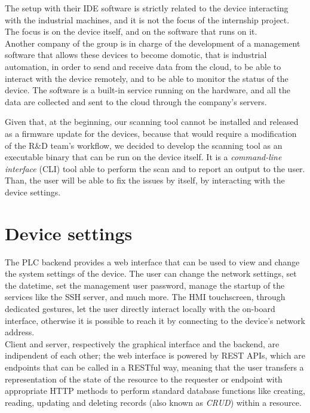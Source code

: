 The setup with their IDE software is strictly related to the device interacting with the industrial machines, and it is not the focus of the internship project. The focus is on the device itself, and on the software that runs on it. \\
Another company of the group is in charge of the development of a management software that allows these devices to become domotic, that is industrial automation, in order to send and receive data from the cloud, to be able to interact with the device remotely, and to be able to monitor the status of the device. The software is a built-in service running on the hardware, and all the data are collected and sent to the cloud through the company's servers.

Given that, at the beginning, our scanning tool cannot be installed and released as a firmware update for the devices, because that would require a modification of the R\&D team's workflow, we decided to develop the scanning tool as an executable binary that can be run on the device itself. It is a \textit{command-line interface} (CLI) tool able to perform the scan and to report an output to the user. Than, the user will be able to fix the issues by itself, by interacting with the device settings.

\section{Device settings}

The PLC backend provides a web interface that can be used to view and change the system settings of the device. The user can change the network settings, set the datetime, set the management user password, manage the startup of the services like the SSH server, and much more. The HMI touchscreen, through dedicated gestures, let the user directly interact locally with the on-board interface, otherwise it is possible to reach it by connecting to the device's network address. \\
Client and server, respectively the graphical interface and the backend, are indipendent of each other; the web interface is powered by REST APIs, which are endpoints that can be called in a RESTful way, meaning that the user transfers a representation of the state of the resource to the requester or endpoint with appropriate HTTP methods to perform standard database functions like creating, reading, updating and deleting records (also known as \textit{CRUD}) within a resource.~\cite{rest-api}

